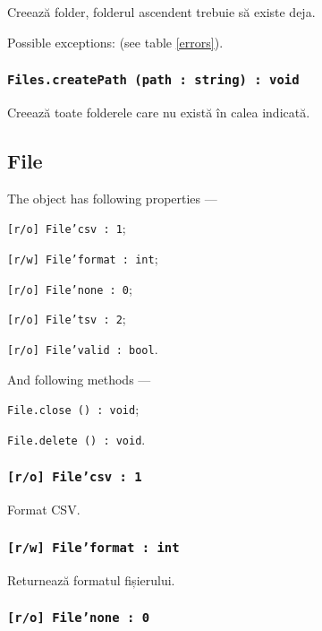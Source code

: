 Creează folder, folderul ascendent trebuie să existe deja.

Possible exceptions:  (see table \ref{errors}).

\subsubsection{\texttt{Files.createPath (path : string) : void}}

Creează toate folderele care nu există în calea indicată.

\subsection{{\color{orange} File}}

The object \file{} has following properties —
\begin{icItems}
	\item \texttt{[r/o] File'csv : 1};
	\item \texttt{[r/w] File'format : int};
	\item \texttt{[r/o] File'none : 0};
	\item \texttt{[r/o] File'tsv : 2};
	\item \texttt{[r/o] File'valid : bool}.
\end{icItems}

And following methods —
\begin{icItems}
	\item \texttt{File.close () : void};
	\item \texttt{File.delete () : void}.
\end{icItems}

\subsubsection{\texttt{[r/o] File'csv : 1}}

Format CSV.

\subsubsection{\texttt{[r/w] File'format : int}}

Returnează formatul fișierului.

\subsubsection{\texttt{[r/o] File'none : 0}}

